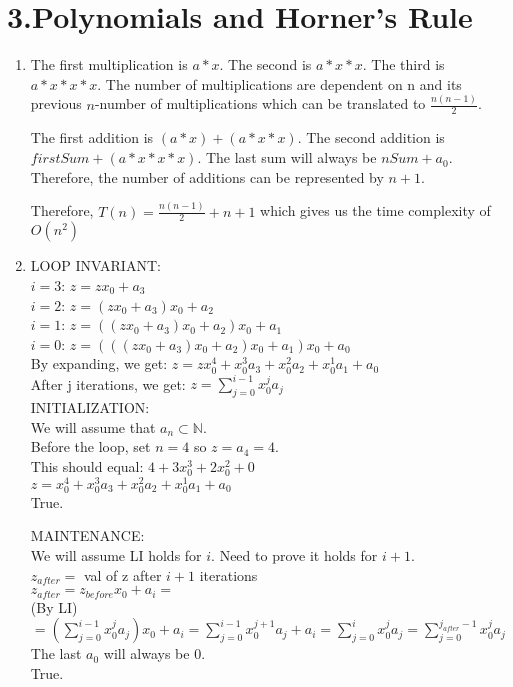 \documentclass[11pt]{article}
\newenvironment{qparts}{\begin{enumerate}[{(}a{)}]}{\end{enumerate}}
\begin{document}
\newpage
\section*{3.Polynomials and Horner's Rule}
\begin{qparts}
\item
The first multiplication is $a * x$. The second is $a * x * x$. The third is $a * x * x * x$. The number of multiplications are dependent on n and its previous $n$-number of multiplications which can be translated to $\frac{n(n-1)}{2}$. 

The first addition is $(a * x) + (a * x * x)$. The second addition is $firstSum + (a * x * x * x)$. The last sum will always be $nSum + a_{0}$. Therefore, the number of additions can be represented by $n+1$.

Therefore, $T(n) = \frac{n(n-1)}{2} + n + 1$ which gives us the time complexity of $O(n^2)$

\item
LOOP INVARIANT:\\
$i = 3$: $z = zx_{0} + a_3$\\
$i = 2$: $z = (zx_{0} + a_{3})x_{0} + a_{2}$\\
$i = 1$: $z = ((zx_{0} + a_{3})x_{0} + a_{2})x_{0} + a_{1}$\\
$i = 0$: $z = (((zx_{0} + a_{3})x_{0} + a_{2})x_{0} + a_{1})x_{0} + a_{0}$\\
By expanding, we get: $z = zx_{0}^{4} + x_{0}^{3}a_{3} + x_{0}^{2}a_{2} + x_{0}^{1}a_{1} + a_{0}$\\
After j iterations, we get: $z = \sum_{j = 0}^{i-1} x_{0}^{j}a_{j} $\\

INITIALIZATION:\\
We will assume that $a_{n} \subset \mathbb{N}$.\\
Before the loop, set $n = 4$ so $z = a_{4} = 4$.\\
This should equal: $4+3x_{0}^{3}+2x_{0}^{2}+0$\\
$z = x_{0}^{4} + x_{0}^{3}a_{3} + x_{0}^{2}a_{2} + x_{0}^{1}a_{1} + a_{0}$\\
True.

MAINTENANCE:\\
We will assume LI holds for $i$. Need to prove it holds for $i+1$. \\
$z_{after} = $ val of z after $i+1$ iterations \\
$z_{after} = z_{before}x_{0} + a_{i} = $ \\
(By LI) \\
$= (\sum_{j = 0}^{i-1} x_{0}^{j}a_{j})x_{0} + a_{i} = \sum_{j = 0}^{i-1} x_{0}^{j+1}a_{j} + a_{i} = \sum_{j = 0}^{i} x_{0}^{j}a_{j} = \sum_{j = 0}^{j_{after}-1} x_{0}^{j}a_{j} $\\
The last $a_{0}$ will always be 0.\\
True.


\end{qparts}
\end{document}
